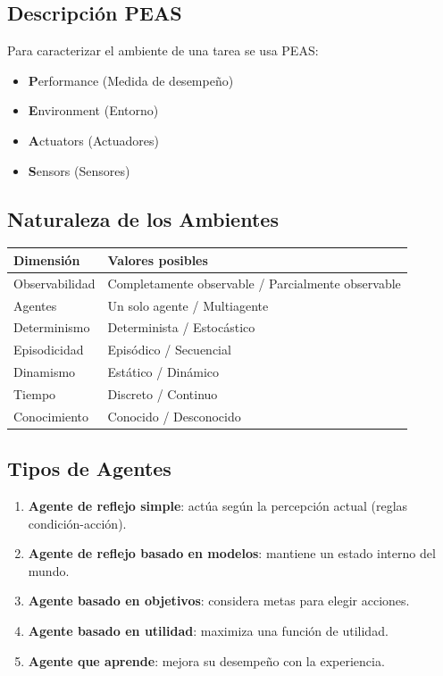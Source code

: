 \subsection{Descripción PEAS}

Para caracterizar el ambiente de una tarea se usa PEAS:
\begin{itemize}
    \item \textbf{P}erformance (Medida de desempeño)
    \item \textbf{E}nvironment (Entorno)
    \item \textbf{A}ctuators (Actuadores)
    \item \textbf{S}ensors (Sensores)
\end{itemize}

\subsection{Naturaleza de los Ambientes}

\begin{tabular}{ll}
\toprule
\textbf{Dimensión} & \textbf{Valores posibles} \\
\midrule
Observabilidad & Completamente observable / Parcialmente observable \\
Agentes & Un solo agente / Multiagente \\
Determinismo & Determinista / Estocástico \\
Episodicidad & Episódico / Secuencial \\
Dinamismo & Estático / Dinámico \\
Tiempo & Discreto / Continuo \\
Conocimiento & Conocido / Desconocido \\
\bottomrule
\end{tabular}

\subsection{Tipos de Agentes}

\begin{enumerate}
    \item \textbf{Agente de reflejo simple}: actúa según la percepción actual (reglas condición-acción).
    \item \textbf{Agente de reflejo basado en modelos}: mantiene un estado interno del mundo.
    \item \textbf{Agente basado en objetivos}: considera metas para elegir acciones.
    \item \textbf{Agente basado en utilidad}: maximiza una función de utilidad.
    \item \textbf{Agente que aprende}: mejora su desempeño con la experiencia.
\end{enumerate}
